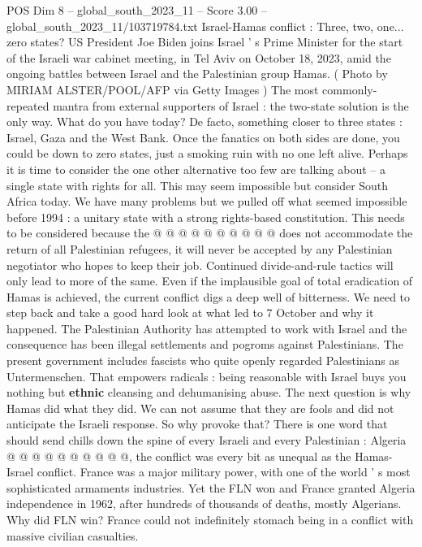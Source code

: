 \begin{textsample}{POS Dim 8 – global\_south\_2023\_11 – Score 3.00 – global\_south\_2023\_11/103719784.txt}  \label{ex:f8_pos_370}
Israel-Hamas conflict : Three, two, one... zero states?
US President Joe Biden joins Israel ' s Prime Minister for the start of the Israeli war cabinet meeting, in Tel Aviv on October 18, 2023, amid the ongoing battles between Israel and the Palestinian group Hamas. ( Photo by MIRIAM ALSTER/POOL/AFP via Getty Images ) The most commonly-repeated mantra from external supporters of Israel : the two-state solution is the only way.
What do you have today?
De facto, something closer to three states : Israel, Gaza and the West Bank.
Once the fanatics on both sides are done, you could be down to zero states, just a smoking ruin with no one left alive.
Perhaps it is time to consider the one other alternative too few are talking about -- a single state with rights for all.
This may seem impossible but consider South Africa today.
We have many problems but we pulled off what seemed impossible before 1994 : a unitary state with a strong rights-based constitution.
This needs to be considered because the @ @ @ @ @ @ @ @ @ @ does not accommodate the return of all Palestinian refugees, it will never be accepted by any Palestinian negotiator who hopes to keep their job.
Continued divide-and-rule tactics will only lead to more of the same.
Even if the implausible goal of total eradication of Hamas is achieved, the current conflict digs a deep well of bitterness.
We need to step back and take a good hard look at what led to 7 October and why it happened.
The Palestinian Authority has attempted to work with Israel and the consequence has been illegal settlements and pogroms against Palestinians.
The present government includes fascists who quite openly regarded Palestinians as Untermenschen.
That empowers radicals : being reasonable with Israel buys you nothing but \textbf{ethnic} cleansing and dehumanising abuse.
The next question is why Hamas did what they did.
We can not assume that they are fools and did not anticipate the Israeli response.
So why provoke that?
There is one word that should send chills down the spine of every Israeli and every Palestinian : Algeria @ @ @ @ @ @ @ @ @ @, the conflict was every bit as unequal as the Hamas-Israel conflict.
France was a major military power, with one of the world ' s most sophisticated armaments industries.
Yet the FLN won and France granted Algeria independence in 1962, after hundreds of thousands of deaths, mostly Algerians.
Why did FLN win?
France could not indefinitely stomach being in a conflict with massive civilian casualties.

\end{textsample}
